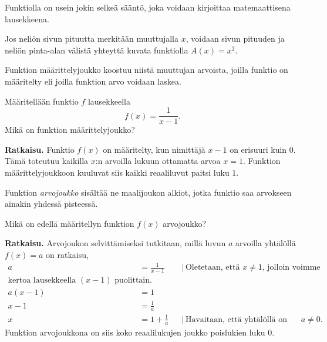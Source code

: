 Funktiolla on usein jokin selkeä sääntö, joka voidaan kirjoittaa
matemaattisena lausekkeena.

\begin{esimerkki}
Jos neliön sivun pituutta merkitään muuttujalla $x$, voidaan sivun pituuden
ja neliön pinta-alan välistä yhteyttä kuvata funktiolla
$A(x) = x^2$.
\end{esimerkki}

Funktion määrittelyjoukko koostuu niistä muuttujan arvoista, joilla
funktio on määritelty eli joilla funktion arvo voidaan laskea.

\begin{esimerkki}
Määritellään funktio $f$ lausekkeella
\[
f(x) = \frac{1}{x-1}.
\]
Mikä on funktion määrittelyjoukko?

\textbf{Ratkaisu.}
Funktio $f(x)$ on määritelty, kun nimittäjä $x-1$ on erisuuri
kuin 0. Tämä toteutuu kaikilla $x$:n arvoilla lukuun ottamatta
arvoa $x = 1$. Funktion määrittelyjoukkoon kuuluvat siis
kaikki reaaliluvut paitsi luku $1$.
\end{esimerkki}

Funktion \emph{arvojoukko} sisältää ne maalijoukon alkiot,
jotka funktio saa arvokseen ainakin yhdessä pisteessä.

\begin{esimerkki}
Mikä on edellä määritellyn funktion $f(x)$ arvojoukko?

\textbf{Ratkaisu.}%
Arvojoukon selvittämiseksi tutkitaan, millä luvun $a$ arvoilla
yhtälöllä $f(x) = a$ on ratkaisu,
\begin{align*}
a &= \frac{1}{x-1} & &| \, \text{Oletetaan, että $x \neq 1$, jolloin voimme} \\ \text{kertoa lausekkeella $(x-1)$ puolittain.} \\
a(x-1) &= 1 \\
x-1 &= \frac{1}{a} \\
x &= 1+\frac{1}{a} & &| \, \text{Havaitaan, että yhtälöllä on ratkaisu
kaikilla $a \neq 0$.}
\end{align*}
Funktion arvojoukkona on siis koko reaalilukujen joukko poislukien luku $0$.
\end{esimerkki}



